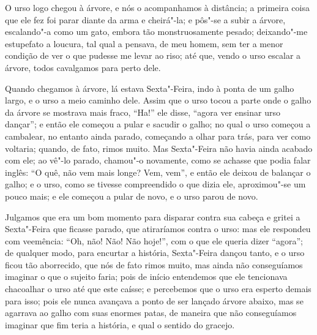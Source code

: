 O urso logo chegou à árvore, e nós o acompanhamos à distância; a
primeira coisa que ele fez foi parar diante da arma e cheirá"-la; e
pôs"-se a subir a árvore, escalando"-a como um gato, embora tão
monstruosamente pesado; deixando"-me estupefato a loucura, tal qual a
pensava, de meu homem, sem ter a menor condição de ver o que pudesse me
levar ao riso; até que, vendo o urso escalar a árvore, todos cavalgamos
para perto dele.

Quando chegamos à árvore, lá estava Sexta"-Feira, indo à ponta de um
galho largo, e o urso a meio caminho dele. Assim que o urso tocou a
parte onde o galho da árvore se mostrava mais fraco, ``Ha!'' ele disse,
``agora ver ensinar urso dançar''; e então ele começou a pular e sacudir
o galho; no qual o urso começou a cambalear, no entanto ainda parado,
começando a olhar para trás, para ver como voltaria; quando, de fato,
rimos muito. Mas Sexta"-Feira não havia ainda acabado com ele; ao vê"-lo
parado, chamou"-o novamente, como se achasse que podia falar inglês: ``O
quê, não vem mais longe? Vem, vem'', e então ele deixou de balançar o
galho; e o urso, como se tivesse compreendido o que dizia ele,
aproximou"-se um pouco mais; e ele começou a pular de novo, e o urso
parou de novo.

Julgamos que era um bom momento para disparar contra sua cabeça e gritei
a Sexta"-Feira que ficasse parado, que atiraríamos contra o urso: mas ele
respondeu com veemência: ``Oh, não! Não! Não hoje!'', com o que ele
queria dizer ``agora''; de qualquer modo, para encurtar a história,
Sexta"-Feira dançou tanto, e o urso ficou tão aborrecido, que nós de fato
rimos muito, mas ainda não conseguíamos imaginar o que o sujeito faria;
pois de início entendemos que ele tencionava chacoalhar o urso até que
este caísse; e percebemos que o urso era esperto demais para isso; pois
ele nunca avançava a ponto de ser lançado árvore abaixo, mas se agarrava
ao galho com suas enormes patas, de maneira que não conseguíamos
imaginar que fim teria a história, e qual o sentido do gracejo.


